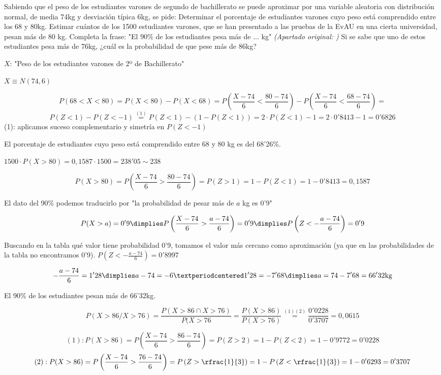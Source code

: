 \documentclass[palatino,nosec,nochap,nobuilddate]{Docencia}
\begin{document}
\begin{problem}
Sabiendo que el peso de los estudiantes varones de segundo de bachillerato se puede aproximar por una variable aleatoria con distribución normal, de media 74kg y desviación típica 6kg, se pide:
\ppart Determinar el porcentaje de estudiantes varones cuyo peso está comprendido entre los 68 y 80kg.
\ppart Estimar cuántos de los 1500 estudiantes varones, que se han presentado a las pruebas de la EvAU en una cierta universidad, pesan más de 80 kg.
\ppart Completa la frase: "El 90\% de los estudiantes pesa más de ... kg"
\ppart \textit{(Apartado original: )} Si se sabe que uno de estos estudiantes pesa más de 76kg, ¿cuál es la probabilidad de que pese más de 86kg?

\solution

$X$: "Peso de los estudiantes varones de 2º de Bachillerato"

$X\equiv N(74,6)$

\spart 
\[
P(68 < X < 80) =  P(X<80) - P(X<68) = 
P\left(\frac{X-74}{6}<\frac{80-74}{6}\right) - 
P\left(\frac{X-74}{6}<\frac{68-74}{6}\right) =\]
\[
P(Z < 1) - P(Z<-1) \overset{(1)}{=} P(Z<1) - (1-P(Z<1)) = 2·P(Z<1) -1 = 2·0'8413 -1 = 0'6826  
\]
(1): aplicamos suceso complementario y simetría en $P(Z<-1)$

El porcentaje de estudiantes cuyo peso está comprendido entre 68 y 80 kg es del 68'26\%.

\spart $1500·P(X>80) = 0,1587·1500 = 238'05 \sim 238$

\[P(X>80) = P\left(\frac{X-74}{6}>\frac{80-74}{6}\right) = P(Z>1) = 1-P(Z<1) = 1-0'8413 = 0,1587\]

\spart El dato del 90\% podemos traducirlo por "la probabilidad de pesar más de $a$ kg es 0'9"

\[P(X>a) = 0'9 \dimplies P\left(\frac{X-74}{6}>\frac{a-74}{6}\right) = 0'9 \dimplies P\left(Z<-\frac{a-74}{6}\right) = 0'9\]

Buscando en la tabla qué valor tiene probabilidad 0'9, tomamos el valor más cercano como aproximación (ya que en las probabilidades de la tabla no encontramos 0'9). $\displaystyle P\left(Z<-\frac{a-74}{6}\right) = 0'8997$

\[-\frac{a-74}{6} = 1'28 \dimplies a-74 = -6·1'28 = -7'68 \dimplies a = 74-7'68 = 66'32\text{kg}\]

El 90\% de los estudiantes pesan más de 66'32kg.

\spart 

\[
P(X>86 /  X>76) = \frac{P(X>86 \cap X>76)}{P(X>76} = \frac{P(X>86)}{P(X>76)} \overset{(1)(2)}{=}\frac{0'0228}{0'3707} = 0,0615
\]

\[(1): P(X>86) = P\left(\frac{X-74}{6}>\frac{86-74}{6}\right) = P(Z>2) = 1-P(Z<2) = 1 - 0'9772 = 0'0228\]
\[(2): P(X>86) = P\left(\frac{X-74}{6}>\frac{76-74}{6}\right) = P\left(Z>\rfrac{1}{3}\right) = 1- P\left(Z<\rfrac{1}{3}\right) = 1-0'6293 = 0'3707\]
\end{problem}
\end{document}
